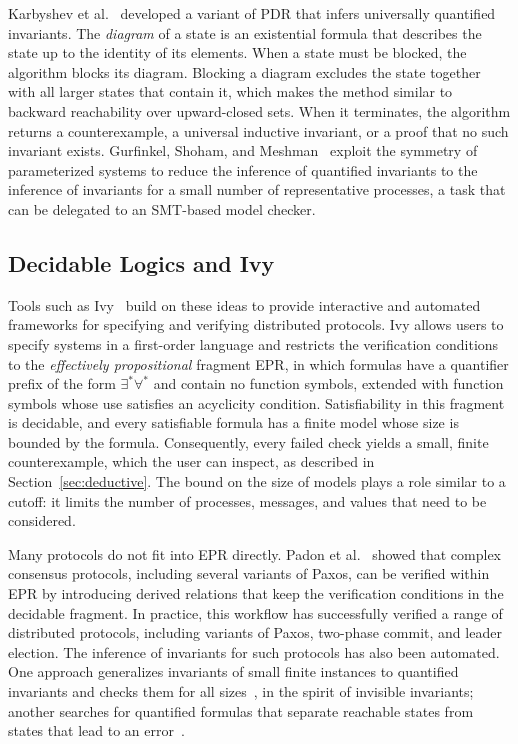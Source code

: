 Karbyshev et al.~\cite{KBIRS17} developed a variant of PDR that infers
universally quantified invariants. The \emph{diagram} of a state is an
existential formula that describes the state up to the identity of its
elements. When a state must be blocked, the algorithm blocks its diagram.
Blocking a diagram excludes the state together with all larger states that
contain it, which makes the method similar to backward reachability over
upward-closed sets. When it terminates, the algorithm returns a
counterexample, a universal inductive invariant, or a proof that no such
invariant exists.
Gurfinkel, Shoham, and Meshman~\cite{GSM16} exploit the symmetry of
parameterized systems to reduce the inference of quantified invariants to the
inference of invariants for a small number of representative processes, a task
that can be delegated to an SMT-based model checker.

\subsection{Decidable Logics and Ivy}

Tools such as Ivy~\cite{PMPSS16} build on these ideas to provide interactive and automated frameworks for specifying and verifying
distributed protocols. Ivy allows users to specify systems in a first-order
language and restricts the verification conditions to the \emph{effectively
propositional} fragment EPR, in which formulas have a quantifier prefix of the
form $\exists^*\forall^*$ and contain no function symbols, extended with
function symbols whose use satisfies an acyclicity condition. Satisfiability
in this fragment is decidable, and every satisfiable formula has
a finite model whose size is bounded by the formula. Consequently, every
failed check yields a small, finite counterexample, which the user can
inspect, as described in Section~\ref{sec:deductive}. The bound on the size
of models plays a role similar to a cutoff: it limits the number of processes,
messages, and values that need to be considered.

Many protocols do not fit into EPR directly. Padon et al.~\cite{PLSS17}
showed that complex consensus protocols, including several variants of Paxos,
can be verified within EPR by introducing derived relations that keep the
verification conditions in the decidable fragment. In practice, this workflow has successfully verified a range of
distributed protocols, including variants of Paxos, two-phase commit, and
leader election. The inference of invariants for such protocols has also been
automated. One approach generalizes invariants of small finite instances to
quantified invariants and checks them for all sizes~\cite{MGJKKS19}, in the
spirit of invisible invariants; another searches for quantified formulas that
separate reachable states from states that lead to an error~\cite{KPIA20}.

